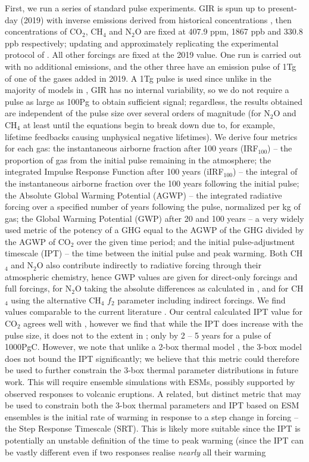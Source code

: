 \documentclass[gmd, manuscript]{copernicus}
\begin{document}
First, we run a series of standard pulse experiments. GIR is spun up to present-day (2019) with inverse emissions derived from historical concentrations \citep{Meinshausen2017}, then concentrations of CO$_2$, CH$_4$ and N$_2$O are fixed at 407.9 ppm, 1867 ppb and 330.8 ppb respectively; updating and approximately replicating the experimental protocol of \cite{Joos2013}. All other forcings are fixed at the 2019 value. One run is carried out with no additional emissions, and the other three have an emission pulse of 1Tg of one of the gases added in 2019. A 1Tg pulse is used since unlike in the majority of models in \cite{Joos2013}, GIR has no internal variability, so we do not require a pulse as large as 100Pg to obtain sufficient signal; regardless, the results obtained are independent of the pulse size over several orders of magnitude (for N$_2$O and CH$_4$ at least until the equations begin to break down due to, for example, lifetime feedbacks causing unphysical negative lifetimes). We derive four metrics for each gas: the instantaneous airborne fraction after 100 years (IRF$_{100}$) -- the proportion of gas from the initial pulse remaining in the atmosphere; the integrated Impulse Response Function after 100 years (iIRF$_{100}$) -- the integral of the instantaneous airborne fraction over the 100 years following the initial pulse; the Absolute Global Warming Potential (AGWP) -- the integrated radiative forcing over a specified number of years following the pulse, normalized per kg of gas; the Global Warming Potential (GWP) after 20 and 100 years -- a very widely used metric of the potency of a GHG equal to the AGWP of the GHG divided by the AGWP of CO$_2$ over the given time period; and the initial pulse-adjustment timescale (IPT) -- the time between the initial pulse and peak warming. Both CH$_4$ and N$_2$O also contribute indirectly to radiative forcing through their atmospheric chemistry, hence GWP values are given for direct-only forcings and full forcings, for N$_2$O taking the absolute differences as calculated in \cite{Myhre2013a}, and for CH$_4$ using the alternative CH$_4$ $f_2$ parameter including indirect forcings. We find values comparable to the current literature \citep{Joos2013,Ricke2014,Collins2019}. Our central calculated IPT value for CO$_2$ agrees well with \cite{Zickfeld2015,Ricke2014}, however we find that while the IPT does increase with the pulse size, it does not to the extent in \citeauthor{Zickfeld2015}; only by 2 -- 5 years for a pulse of 1000PgC. However, we note that unlike a 2-box thermal model \citep{Ricke2014}, the 3-box model does not bound the IPT significantly; we believe that this metric could therefore be used to further constrain the 3-box thermal parameter distributions in future work. This will require ensemble simulations with ESMs, possibly supported by observed responses to volcanic eruptions. A related, but distinct metric that may be used to constrain both the 3-box thermal parameters and IPT based on ESM ensembles is the initial rate of warming in response to a step change in forcing -- the Step Response Timescale (SRT). This is likely more suitable since the IPT is potentially an unstable definition of the time to peak warming (since the IPT can be vastly different even if two responses realise \emph{nearly} all their warming 
\end{document}
